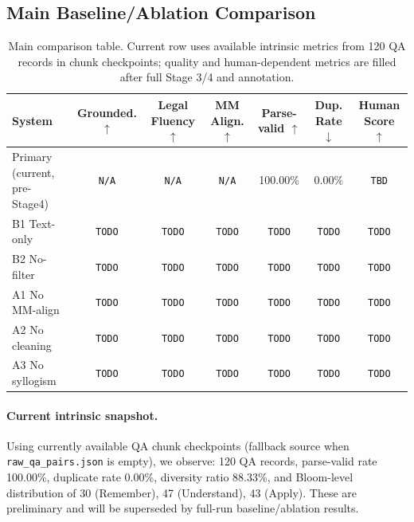 \subsection{Main Baseline/Ablation Comparison}
\begin{table}[t]
\centering
\small
\begin{tabular}{lcccccc}
\hline
System & Grounded. $\uparrow$ & Legal Fluency $\uparrow$ & MM Align. $\uparrow$ & Parse-valid $\uparrow$ & Dup. Rate $\downarrow$ & Human Score $\uparrow$ \\
\hline
Primary (current, pre-Stage4) & \texttt{N/A} & \texttt{N/A} & \texttt{N/A} & 100.00\% & 0.00\% & \texttt{TBD} \\
B1 Text-only & \texttt{TODO} & \texttt{TODO} & \texttt{TODO} & \texttt{TODO} & \texttt{TODO} & \texttt{TODO} \\
B2 No-filter & \texttt{TODO} & \texttt{TODO} & \texttt{TODO} & \texttt{TODO} & \texttt{TODO} & \texttt{TODO} \\
A1 No MM-align & \texttt{TODO} & \texttt{TODO} & \texttt{TODO} & \texttt{TODO} & \texttt{TODO} & \texttt{TODO} \\
A2 No cleaning & \texttt{TODO} & \texttt{TODO} & \texttt{TODO} & \texttt{TODO} & \texttt{TODO} & \texttt{TODO} \\
A3 No syllogism & \texttt{TODO} & \texttt{TODO} & \texttt{TODO} & \texttt{TODO} & \texttt{TODO} & \texttt{TODO} \\
\hline
\end{tabular}
\caption{Main comparison table. Current row uses available intrinsic metrics from 120 QA records in chunk checkpoints; quality and human-dependent metrics are filled after full Stage 3/4 and annotation.}
\label{tab:main_results}
\end{table}

\paragraph{Current intrinsic snapshot.}
Using currently available QA chunk checkpoints (fallback source when \texttt{raw\_qa\_pairs.json} is empty), we observe: 120 QA records, parse-valid rate 100.00\%, duplicate rate 0.00\%, diversity ratio 88.33\%, and Bloom-level distribution of 30 (Remember), 47 (Understand), 43 (Apply). These are preliminary and will be superseded by full-run baseline/ablation results.

